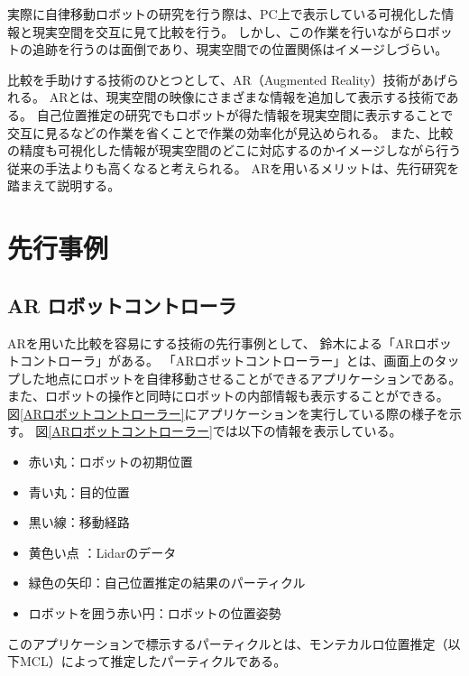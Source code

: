 実際に自律移動ロボットの研究を行う際は、PC上で表示している可視化した情報と現実空間を交互に見て比較を行う。
しかし、この作業を行いながらロボットの追跡を行うのは面倒であり、現実空間での位置関係はイメージしづらい。

比較を手助けする技術のひとつとして、AR（Augmented Reality）技術があげられる。
ARとは、現実空間の映像にさまざまな情報を追加して表示する技術である。
自己位置推定の研究でもロボットが得た情報を現実空間に表示することで
交互に見るなどの作業を省くことで作業の効率化が見込められる。
また、比較の精度も可視化した情報が現実空間のどこに対応するのかイメージしながら行う従来の手法よりも高くなると考えられる。
ARを用いるメリットは、先行研究を踏まえて説明する。


\section{先行事例}

\subsection{AR ロボットコントローラ}

ARを用いた比較を容易にする技術の先行事例として、
鈴木による「ARロボットコントローラ」\cite{鈴木勇矢2019ARロボットコントローラ}がある。
「ARロボットコントローラー」とは、画面上のタップした地点にロボットを自律移動させることができるアプリケーションである。
また、ロボットの操作と同時にロボットの内部情報も表示することができる。
図\ref{ARロボットコントローラー}にアプリケーションを実行している際の様子を示す。
図\ref{ARロボットコントローラー}では以下の情報を表示している。
\begin{itemize}
      \item 赤い丸：ロボットの初期位置
      \item 青い丸：目的位置
      \item 黒い線：移動経路
      \item 黄色い点 ：Lidarのデータ
      \item 緑色の矢印：自己位置推定の結果のパーティクル
　　　\item ロボットを囲う赤い円：ロボットの位置姿勢
\end{itemize}
このアプリケーションで標示するパーティクルとは、モンテカルロ位置推定（以下MCL）によって推定したパーティクルである。

